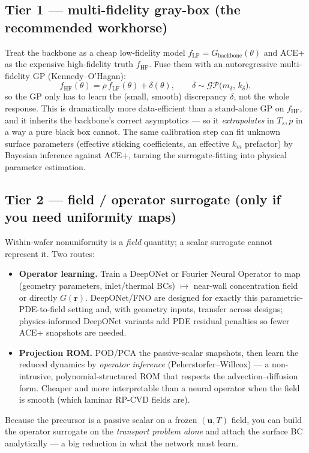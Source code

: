 \documentclass[11pt]{article}
\newcommand{\uv}{\mathbf{u}}
\begin{document}
\subsection{Tier 1 --- multi-fidelity gray-box (the recommended workhorse)}
Treat the backbone as a cheap low-fidelity model $f_{\text{LF}}=G_{\text{backbone}}(\theta)$ and ACE+ as the expensive high-fidelity truth $f_{\text{HF}}$. Fuse them with an autoregressive multi-fidelity GP (Kennedy--O'Hagan):
\begin{equation}
f_{\text{HF}}(\theta)=\rho\,f_{\text{LF}}(\theta)+\delta(\theta),\qquad
\delta\sim\mathcal{GP}\!\big(m_\delta,\,k_\delta\big),
\end{equation}
so the GP only has to learn the (small, smooth) discrepancy $\delta$, not the whole response. This is dramatically more data-efficient than a stand-alone GP on $f_{\text{HF}}$, and it inherits the backbone's correct asymptotics --- so it \emph{extrapolates} in $T_s,p$ in a way a pure black box cannot. The same calibration step can fit unknown surface parameters (effective sticking coefficients, an effective $k_m$ prefactor) by Bayesian inference against ACE+, turning the surrogate-fitting into physical parameter estimation.

\subsection{Tier 2 --- field / operator surrogate (only if you need uniformity maps)}
Within-wafer nonuniformity is a \emph{field} quantity; a scalar surrogate cannot represent it. Two routes:
\begin{itemize}[leftmargin=1.4em,itemsep=2pt]
\item \textbf{Operator learning.} Train a DeepONet or Fourier Neural Operator to map (geometry parameters, inlet/thermal BCs) $\mapsto$ near-wall concentration field or directly $G(\mathbf r)$. DeepONet/FNO are designed for exactly this parametric-PDE-to-field setting and, with geometry inputs, transfer across designs; physics-informed DeepONet variants add PDE residual penalties so fewer ACE+ snapshots are needed.
\item \textbf{Projection ROM.} POD/PCA the passive-scalar snapshots, then learn the reduced dynamics by \emph{operator inference} (Peherstorfer--Willcox) --- a non-intrusive, polynomial-structured ROM that respects the advection--diffusion form. Cheaper and more interpretable than a neural operator when the field is smooth (which laminar RP-CVD fields are).
\end{itemize}
Because the precursor is a passive scalar on a frozen $(\uv,T)$ field, you can build the operator surrogate on the \emph{transport problem alone} and attach the surface BC analytically --- a big reduction in what the network must learn.
\end{document}
